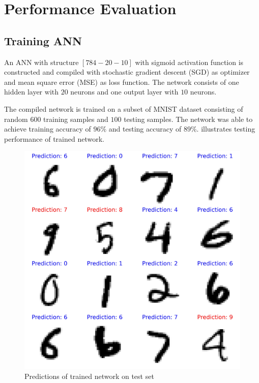 \section{Performance Evaluation}
    \subsection*{Training ANN}
        
        An ANN with structure $[784-20-10]$ with sigmoid activation function is constructed and compiled with stochastic gradient descent (SGD) as optimizer and mean square error (MSE) as loss function. The network consists of one hidden layer with $20$ neurons and one output layer with $10$ neurons. 

        The compiled network is trained on a subset of MNIST dataset consisting of random $600$ training samples and $100$ testing samples. The network was able to achieve training accuracy of $96\%$ and testing accuracy of $89\%$.  illustrates testing performance of trained network.

        \begin{figure}[H]
            \centering
            \includegraphics[width=\linewidth]{images/trained_predictions.jpg}
            \caption{Predictions of trained network on test set}
            \label{fig:training_results}
        \end{figure}

